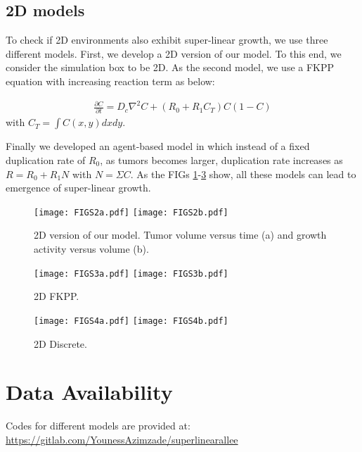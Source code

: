 \documentclass[aps,prl, superscriptaddress,groupedaddress]{revtex4}  %
\begin{document}
 	
 	\subsection{2D models}
 	
 	To check if 2D environments also exhibit super-linear growth, we use three different models. First, we develop a 2D version of our model. To this end, we consider the simulation box to be 2D. As the second model, we use a FKPP equation with increasing reaction term as below: 
 	
 	\begin{eqnarray}
 		\frac{\partial C } {\partial t}
 		= D_c\nabla^2 C  + (R_0 +R_1 C_T)  C (1-C)  
 		\label{Eq1}
 	\end{eqnarray} 
 	with $C_T=\int C(x,y) dx dy$. 
 	
 	Finally we developed an agent-based model  \cite{azimzade2019short} in which instead of a fixed duplication rate of $R_0$, as tumors becomes larger, duplication rate increases as $R=R_0+R_1 N$ with $N= \Sigma C$. 
 	As the FIGs \ref{FIGS2}-\ref{FIGS4} show, all these models can lead to emergence of super-linear growth.  
 	\begin{figure} 
 		\centering
 		\texttt{[image: FIGS2a.pdf]} 
 		\texttt{[image: FIGS2b.pdf]}   
 		\caption{2D version of our model. Tumor volume versus time (a) and growth activity versus volume (b).}
 		\label{FIGS2}
 	\end{figure}
 	
 	\begin{figure} 
 		\centering
 		\texttt{[image: FIGS3a.pdf]} 
 		\texttt{[image: FIGS3b.pdf]}   
 		\caption{2D  FKPP.}
 		\label{FIGS3}
 	\end{figure}
 	
 	\begin{figure} 
 		\centering
 		\texttt{[image: FIGS4a.pdf]} 
 		\texttt{[image: FIGS4b.pdf]}   
 		\caption{2D Discrete.}
 		\label{FIGS4}
 	\end{figure}
 	
 	
 	\section{Data Availability}
 	Codes for different models are provided at:   \url{https://gitlab.com/YounessAzimzade/superlinearallee}
	
\end{document}
